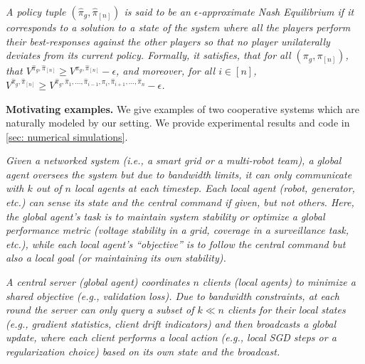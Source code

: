 \begin{definition}\label{def:approx-nash}\emph{ A policy tuple $(\hat{\pi}_g, \hat{\pi}_{[n]})$ is said to be an $\epsilon$-approximate Nash Equilibrium if it corresponds to a solution to a state of the system  where all the players perform their best-responses against the other players so that no player unilaterally deviates from its current policy. Formally, it satisfies, that for all $(\pi_g, \pi_{[n]})$, that  $V^{\hat{\pi}_g, \hat{\pi}_{[n]}} \geq V^{\pi_g, \hat{\pi}_{[n]}} - \epsilon$, and moreover, for all $i\in[n]$, $V^{\hat{\pi}_g, \hat{\pi}_{[n]}} \geq V^{\hat{\pi}_g, \hat{\pi}_1, ..., \hat{\pi}_{i-1}, \pi_i, \hat{\pi}_{i+1}, ..., \hat{\pi}_n} - \epsilon$.}
\end{definition} 

\textbf{Motivating examples.} We give examples of two cooperative systems which are naturally modeled by our setting. We provide experimental results and code in \cref{sec: numerical simulations}.

 \begin{example} 
\emph{Given a networked system (i.e., a smart grid  or a multi-robot team), a  global agent  oversees the system but due to bandwidth limits, it can only communicate with $k$ out of $n$  local agents  at each timestep. Each local agent (robot, generator, etc.) can sense its state and  the central command if given, but not others. Here, the global agent's task is  to maintain  system stability or optimize a global performance metric (voltage stability in a grid, coverage in a surveillance task, etc.), while each local agent’s ``objective'' is to follow the central command but also a local goal (or maintaining its own stability).}
\end{example}
 

 \begin{example} \emph{A central server (global agent) coordinates $n$ clients (local agents) to minimize a shared objective (e.g., validation loss). Due to bandwidth constraints, at each round the server can only query a subset of $k\ll n$ clients for their local states (e.g., gradient statistics, client drift indicators) and then broadcasts a global update, where each client performs a local action (e.g., local SGD steps or a regularization choice) based on its own state and the broadcast.} 
\end{example}


